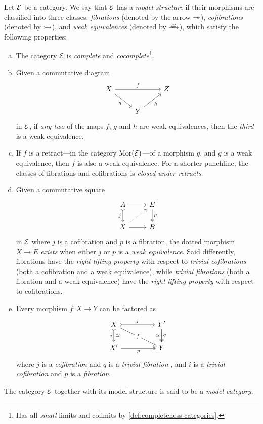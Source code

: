 \begin{definition}
\label{def:model-category}
Let \(\mathcal E\) be a category. We say that \(\mathcal E\) has a \emph{model
  structure} if their morphisms are classified into three classes:
\emph{fibrations} (denoted by the arrow \(\twoheadrightarrow\)), \emph{cofibrations} (denoted
by \(\rightarrowtail\)), and \emph{weak equivalences} (denoted by \(\isoto\)), which
satisfy the following properties:
\begin{enumerate}[(a)]\setlength\itemsep{0em}
\item The category \(\mathcal E\) is \emph{complete} and
  \emph{cocomplete}\footnote{Has all \emph{small} limits and colimits by
    \cref{def:completeness-categories}.}.

\item Given a commutative diagram
  \[
  \begin{tikzcd}
  X \ar[rr, "f"] \ar[rd, "g"'] & &Z \\
  &Y \ar[ru, "h"']
  \end{tikzcd}
  \]
  in \(\mathcal E\), if \emph{any two} of the maps \(f\), \(g\) and \(h\) are weak
  equivalences, then the \emph{third} is a weak equivalence.

\item If \(f\) is a retract---in the category \(\operatorname{Mor}(\mathcal E)\)---of a morphism
  \(g\), and \(g\) is a weak equivalence, then \(f\) is also a weak
  equivalence. For a shorter punchline, the classes of fibrations and
  cofibrations is \emph{closed under retracts}.

\item Given a commutative square
  \[
  \begin{tikzcd}
  A \ar[r] \ar[d, tail, "j"'] &E \ar[d, two heads, "p"] \\
  X \ar[ur, dotted] \ar[r] &B
  \end{tikzcd}
  \]
  in \(\mathcal E\) where \(j\) is a cofibration and \(p\) is a fibration, the
  dotted morphism \(X \to E\) \emph{exists} when either \(j\) or \(p\) is a
  \emph{weak equivalence}. Said differently, fibrations have the \emph{right
    lifting property} with respect to \emph{trivial cofibrations} (both a
  cofibration and a weak equivalence), while \emph{trivial fibrations} (both a
  fibration and a weak equivalence) have the \emph{right lifting property} with
  respect to cofibrations.

\item Every morphism \(f: X \to Y\) can be factored as
  \[
  \begin{tikzcd}
  X
  \ar[rr, tail, "j"]
  \ar[rrd, "f" description]
  \ar[d, tail, "i"', "\dis"]
  &&Y' \ar[d, two heads, "\dis"', "q"]
  \\
  X' \ar[rr, two heads, "p"']
  &&Y
  \end{tikzcd}
  \]
  where \(j\) is a \emph{cofibration} and \(q\) is a \emph{trivial fibration} ,
  and \(i\) is a \emph{trivial cofibration} and \(p\) is a \emph{fibration}.
\end{enumerate}
The category \(\mathcal E\) together with its model structure is said to be a
\emph{model category}.
\end{definition}

